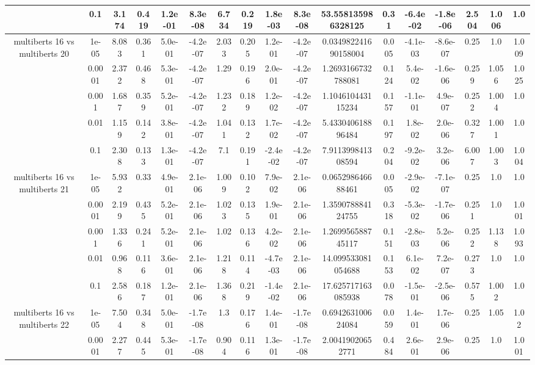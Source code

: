 \begin{tabular}{|c|c|c|c|c|c|c|c|c|c|c|c|c|c|c|c|c|}
 & 0.1 & 3.174 & 0.419 & 1.2e-01 & 8.3e-08 & 6.734 & 0.219 & 1.8e-03 & 8.3e-08 & 53.558135986328125 & 0.31 & -6.4e-02 & -1.8e-06 & 2.504 & 1.006 & 1.0 \\
\hline
\multirow{5}{*}{multiberts 16 vs multiberts 20} & 1e-05 & 8.083 & 0.361 & 5.0e-01 & -4.2e-07 & 2.033 & 0.205 & 1.2e-01 & -4.2e-07 & 0.034982241690158004 & 0.005 & -4.1e-03 & -8.6e-07 & 0.25 & 1.0 & 1.009 \\
 & 0.0001 & 2.372 & 0.468 & 5.3e-01 & -4.2e-07 & 1.29 & 0.196 & 2.0e-01 & -4.2e-07 & 1.2693166732788081 & 0.124 & 5.4e-02 & -1.6e-06 & 0.259 & 1.056 & 1.025 \\
 & 0.001 & 1.687 & 0.359 & 5.2e-01 & -4.2e-07 & 1.232 & 0.189 & 1.2e-02 & -4.2e-07 & 1.104610443115234 & 0.157 & -1.1e-01 & 4.9e-07 & 0.252 & 1.004 & 1.0 \\
 & 0.01 & 1.159 & 0.142 & 3.8e-01 & -4.2e-07 & 1.041 & 0.132 & 1.7e-02 & -4.2e-07 & 5.433040618896484 & 0.197 & 1.8e-02 & 2.0e-06 & 0.327 & 1.001 & 1.0 \\
 & 0.1 & 2.308 & 0.133 & 1.3e-01 & -4.2e-07 & 7.1 & 0.191 & -2.4e-02 & -4.2e-07 & 7.911399841308594 & 0.204 & -9.2e-02 & 3.2e-06 & 6.007 & 1.003 & 1.004 \\
\hline
\multirow{5}{*}{multiberts 16 vs multiberts 21} & 1e-05 & 5.932 & 0.33 & 4.9e-01 & 2.1e-06 & 1.009 & 0.102 & 7.9e-02 & 2.1e-06 & 0.065298646688461 & 0.005 & -2.9e-02 & -7.1e-07 & 0.25 & 1.0 & 1.0 \\
 & 0.0001 & 2.199 & 0.435 & 5.2e-01 & 2.1e-06 & 1.023 & 0.135 & 1.9e-01 & 2.1e-06 & 1.359078884124755 & 0.318 & -5.3e-02 & -1.7e-06 & 0.251 & 1.0 & 1.001 \\
 & 0.001 & 1.336 & 0.241 & 5.2e-01 & 2.1e-06 & 1.02 & 0.136 & 4.2e-02 & 2.1e-06 & 1.269956588745117 & 0.151 & -2.8e-03 & 5.2e-06 & 0.252 & 1.138 & 1.093 \\
 & 0.01 & 0.968 & 0.116 & 3.6e-01 & 2.1e-06 & 1.218 & 0.114 & -4.7e-03 & 2.1e-06 & 14.099533081054688 & 0.153 & 6.1e-02 & 7.2e-07 & 0.273 & 1.0 & 1.0 \\
 & 0.1 & 2.586 & 0.187 & 1.2e-01 & 2.1e-06 & 1.368 & 0.219 & -1.4e-02 & 2.1e-06 & 17.625717163085938 & 0.078 & -1.5e-01 & -2.5e-06 & 0.575 & 1.002 & 1.0 \\
\hline
\multirow{5}{*}{multiberts 16 vs multiberts 22} & 1e-05 & 7.504 & 0.348 & 5.0e-01 & -1.7e-08 & 1.3 & 0.176 & 1.4e-01 & -1.7e-08 & 0.694263100624084 & 0.059 & 1.4e-01 & 1.7e-06 & 0.25 & 1.05 & 1.02 \\
 & 0.0001 & 2.277 & 0.445 & 5.3e-01 & -1.7e-08 & 0.904 & 0.116 & 1.3e-01 & -1.7e-08 & 2.00419020652771 & 0.484 & 2.6e-01 & 2.9e-06 & 0.25 & 1.0 & 1.001 \\

\end{tabular}
